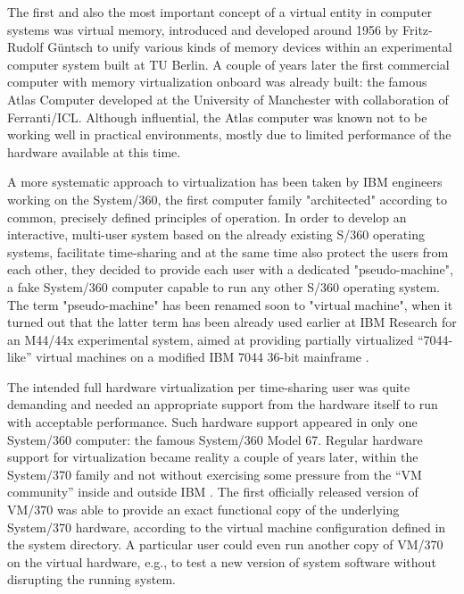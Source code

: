 \documentclass[11pt,a4paper]{llncs}
\begin{document}
The first and also the most important concept of a virtual entity in computer 
systems was virtual memory, introduced and developed around 1956 by 
Fritz-Rudolf G{\"u}ntsch \cite{ISp19_216} to unify various kinds of memory 
devices within an experimental computer system built at TU Berlin.
A couple of years later the first commercial computer with memory 
virtualization onboard was already built: the famous Atlas Computer 
\cite{MIT_FCHA_Atlas}
developed at the University of Manchester with collaboration of Ferranti/ICL. 
Although influential, the Atlas computer was known not to be working well in 
practical environments, mostly due to limited performance of the hardware
available at this time. 


A more systematic approach to virtualization has been taken by IBM engineers 
working on the System/360, the first computer family "architected" according 
to common, precisely defined principles of operation. 
In order to develop an interactive, multi-user system based on the already 
existing S/360 operating systems, facilitate time-sharing and at the same 
time also protect the users from each other, they decided to provide each user 
with a dedicated "pseudo-machine", a fake System/360 computer capable to run 
any other S/360 operating system. 
The term "pseudo-machine" has been renamed soon to "virtual machine", when it 
turned out that the latter term has been already used earlier at IBM Research 
for an M44/44x experimental system, aimed at providing partially virtualized
``7044-like'' virtual machines on a modified IBM 7044 36-bit mainframe 
\cite{IBMSJ11_99}. 


The intended full hardware virtualization per time-sharing user was quite
demanding and needed an appropriate support from the hardware itself to run 
with acceptable performance. 
Such hardware support appeared in only one System/360 computer: the famous
System/360 Model 67.
Regular hardware support for virtualization became reality a couple of years 
later, within the System/370 family and not without exercising some pressure 
from the ``VM community'' inside and outside IBM \cite{Melinda_V}. 
The first officially released version of VM/370 was able to provide an exact
functional copy of the underlying System/370 hardware, according to the
virtual machine configuration defined in the system directory. A particular
user could even run another copy of VM/370 on the virtual hardware, e.g., to
test a new version of system software without disrupting the running system.
     
\end{document}
